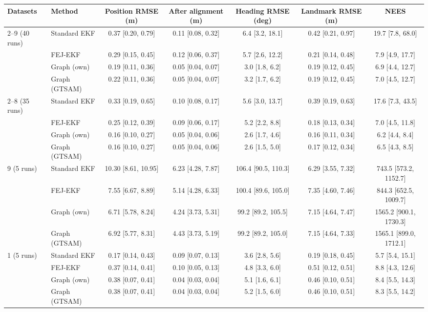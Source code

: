 \begin{tabular}{@{}llccccc@{}}
\toprule
Datasets & Method & Position RMSE (m) & After alignment (m) & Heading RMSE (deg) & Landmark RMSE (m) & NEES \\
\midrule
2--9 (40 runs) & Standard EKF & 0.37 [0.20, 0.79] & 0.11 [0.08, 0.32] & 6.4 [3.2, 18.1] & 0.42 [0.21, 0.97] & 19.7 [7.8, 68.0] \\
 & FEJ-EKF & 0.29 [0.15, 0.45] & 0.12 [0.06, 0.37] & 5.7 [2.6, 12.2] & 0.21 [0.14, 0.48] & 7.9 [4.9, 17.7] \\
 & Graph (own) & 0.19 [0.11, 0.36] & 0.05 [0.04, 0.07] & 3.0 [1.8, 6.2] & 0.19 [0.12, 0.45] & 6.9 [4.4, 12.7] \\
 & Graph (GTSAM) & 0.22 [0.11, 0.36] & 0.05 [0.04, 0.07] & 3.2 [1.7, 6.2] & 0.19 [0.12, 0.45] & 7.0 [4.5, 12.7] \\
\midrule
2--8 (35 runs) & Standard EKF & 0.33 [0.19, 0.65] & 0.10 [0.08, 0.17] & 5.6 [3.0, 13.7] & 0.39 [0.19, 0.63] & 17.6 [7.3, 43.5] \\
 & FEJ-EKF & 0.25 [0.12, 0.39] & 0.09 [0.06, 0.17] & 5.2 [2.2, 8.8] & 0.18 [0.13, 0.34] & 7.0 [4.5, 11.8] \\
 & Graph (own) & 0.16 [0.10, 0.27] & 0.05 [0.04, 0.06] & 2.6 [1.7, 4.6] & 0.16 [0.11, 0.34] & 6.2 [4.4, 8.4] \\
 & Graph (GTSAM) & 0.16 [0.10, 0.27] & 0.05 [0.04, 0.06] & 2.6 [1.5, 5.0] & 0.17 [0.12, 0.34] & 6.5 [4.3, 8.5] \\
\midrule
9 (5 runs) & Standard EKF & 10.30 [8.61, 10.95] & 6.23 [4.28, 7.87] & 106.4 [90.5, 110.3] & 6.29 [3.55, 7.32] & 743.5 [573.2, 1152.7] \\
 & FEJ-EKF & 7.55 [6.67, 8.89] & 5.14 [4.28, 6.33] & 100.4 [89.6, 105.0] & 7.35 [4.60, 7.46] & 844.3 [652.5, 1009.7] \\
 & Graph (own) & 6.71 [5.78, 8.24] & 4.24 [3.73, 5.31] & 99.2 [89.2, 105.5] & 7.15 [4.64, 7.47] & 1565.2 [900.1, 1730.3] \\
 & Graph (GTSAM) & 6.92 [5.77, 8.31] & 4.43 [3.73, 5.19] & 99.2 [89.2, 105.0] & 7.15 [4.64, 7.33] & 1565.1 [899.0, 1712.1] \\
\midrule
1 (5 runs) & Standard EKF & 0.17 [0.14, 0.43] & 0.09 [0.07, 0.13] & 3.6 [2.8, 5.6] & 0.19 [0.18, 0.45] & 5.7 [5.4, 15.1] \\
 & FEJ-EKF & 0.37 [0.14, 0.41] & 0.10 [0.05, 0.13] & 4.8 [3.3, 6.0] & 0.51 [0.12, 0.51] & 8.8 [4.3, 12.6] \\
 & Graph (own) & 0.38 [0.07, 0.41] & 0.04 [0.03, 0.04] & 5.1 [1.6, 6.1] & 0.46 [0.10, 0.51] & 8.4 [5.5, 14.3] \\
 & Graph (GTSAM) & 0.38 [0.07, 0.41] & 0.04 [0.03, 0.04] & 5.2 [1.5, 6.0] & 0.46 [0.10, 0.51] & 8.3 [5.5, 14.2] \\
\bottomrule
\end{tabular}

